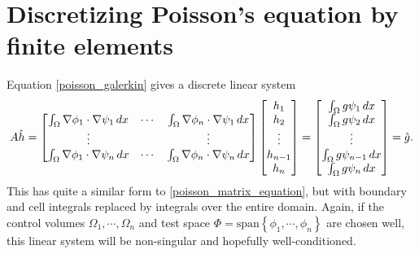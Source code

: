 % 
% 

\section{Discretizing Poisson's equation by finite elements}

Equation \eqref{poisson_galerkin} gives a discrete linear system
\renewcommand{\integralentry}[2]{\int_{\Omega}\nabla\phi_{#2} \cdot \nabla\psi_{#1}\,dx}
\begin{equation}\label{poisson_fem_matrix_equation}
    A\hat{h} = \begin{bmatrix}
            \integralentry{1}{1} & \cdots & \integralentry{1}{n} \\
            \vdots & & \vdots \\
            \integralentry{n}{1} & \cdots & \integralentry{n}{n}
            \end{bmatrix}
    \begin{bmatrix} h_1 \\ h_2 \\ \vdots \\ h_{n-1} \\ h_n \end{bmatrix}
    =
    \begin{bmatrix} \int_{\om}g\psi_1\,dx \\ \int_{\om}g\psi_2\,dx \\ \vdots \\ \int_{\om}g\psi_{n-1}\,dx \\ \int_{\om}g\psi_{n}\,dx \end{bmatrix}
    = \hat{g}.
\end{equation}
This has quite a similar form to \eqref{poisson_matrix_equation}, but with boundary and cell integrals replaced by integrals over the entire
domain.
Again, if the control volumes $\Omega_1,\cdots,\Omega_n$ and test space $\Phi = \text{span}\left\{\phi_1,\cdots,\phi_n\right\}$
are chosen well, this linear system will be non-singular and hopefully well-conditioned.

